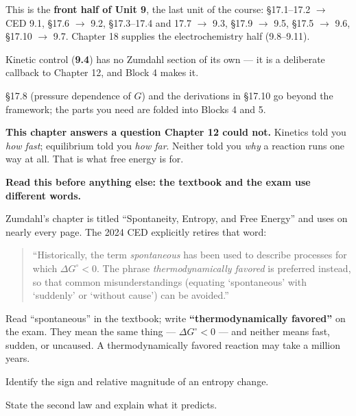 \documentclass{apchem-notes}
\begin{document}
\apctitleblock

\begin{apcnote}
This is the \textbf{front half of Unit 9}, the last unit of the course:
\S17.1--17.2 $\to$ CED 9.1, \S17.6 $\to$ 9.2, \S17.3--17.4 and 17.7
$\to$ 9.3, \S17.9 $\to$ 9.5, \S17.5 $\to$ 9.6, \S17.10 $\to$ 9.7.
Chapter 18 supplies the electrochemistry half (9.8--9.11).

Kinetic control (\textbf{9.4}) has no Zumdahl section of its own --- it is a
deliberate callback to Chapter 12, and Block 4 makes it.

\S17.8 (pressure dependence of $G$) and the derivations in \S17.10 go
beyond the framework; the parts you need are folded into Blocks 4 and 5.

\textbf{This chapter answers a question Chapter 12 could not.} Kinetics told
you \emph{how fast}; equilibrium told you \emph{how far}. Neither told you
\emph{why} a reaction runs one way at all. That is what free energy is for.
\end{apcnote}

\begin{apctrap}
\textbf{Read this before anything else: the textbook and the exam use
different words.}

Zumdahl's chapter is titled ``Spontaneity, Entropy, and Free Energy'' and
uses  on nearly every page. The 2024 CED explicitly
retires that word:

\begin{quote}\small
``Historically, the term \emph{spontaneous} has been used to describe
processes for which $\Delta G^\circ < 0$. The phrase \emph{thermodynamically
favored} is preferred instead, so that common misunderstandings (equating
`spontaneous' with `suddenly' or `without cause') can be avoided.''
\end{quote}

Read ``spontaneous'' in the textbook; write \textbf{``thermodynamically
favored''} on the exam. They mean the same thing --- $\Delta G^\circ < 0$
--- and neither means fast, sudden, or uncaused. A thermodynamically favored
reaction may take a million years.
\end{apctrap}


\begin{objectives}
  \item Identify the sign and relative magnitude of an entropy change.
  \item State the second law and explain what it predicts.
\end{objectives}
\end{document}
